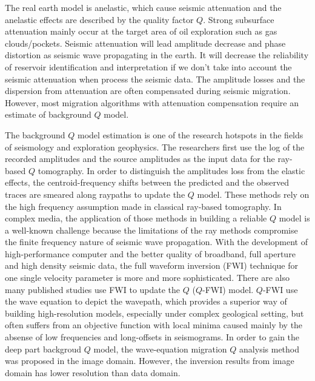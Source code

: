 

\begin{englishabstract}

The real earth model is anelastic, which cause seismic attenuation and the 
anelastic effects are described by the quality factor $Q$. Strong subsurface attenuation 
mainly occur at the target area of oil exploration such as gas clouds/pockets. 
Seismic attenuation will lead amplitude decrease and phase distortion as seismic wave 
propagating in the earth. It will decrease the reliability of reservoir identification 
and interpretation if we don't take into account the seismic attenuation when process the seismic 
data. The amplitude losses and the dispersion from attenuation are often compensated during 
seismic migration. However, most migration algorithms with attenuation compensation 
require an estimate of background $Q$ model.

The background $Q$ model estimation is one of the research hotspots in the fields of 
seismology and exploration geophysics. The researchers first use the log of the recorded 
amplitudes and the source amplitudes as the input data for the ray-based $Q$ tomography.
In order to distinguish the amplitudes loss from the elastic effects, the centroid-frequency 
shifts between the predicted and the observed traces are smeared along raypaths to update 
the $Q$ model. These methods rely on the high frequency assumption made in classical 
ray-based tomography. In complex media, the application of those
methods in building a reliable $Q$ model is a well-known challenge because the limitations 
of the ray methods compromise the finite frequency nature of seismic wave propagation.
With the development of high-performance computer and the better quality of broadband, full 
aperture and high density seismic data, the full waveform inversion (FWI) technique for 
one single velocity parameter is more and more sophisticated. There are also many published 
studies use FWI to update the $Q$ ($Q$-FWI) model. $Q$-FWI use the wave equation to 
depict the wavepath, which provides a superior way of building high-resolution models, 
especially under complex geological setting, but often suffers from an objective 
function with local minima caused mainly by the absense of low frequencies and long-offsets 
in seismograms. In order to gain the deep part backgroud $Q$ model, the wave-equation 
migration $Q$ analysis method was proposed in the image domain. However, the inversion 
results from image domain has lower resolution than data domain.


\end{englishabstract}
